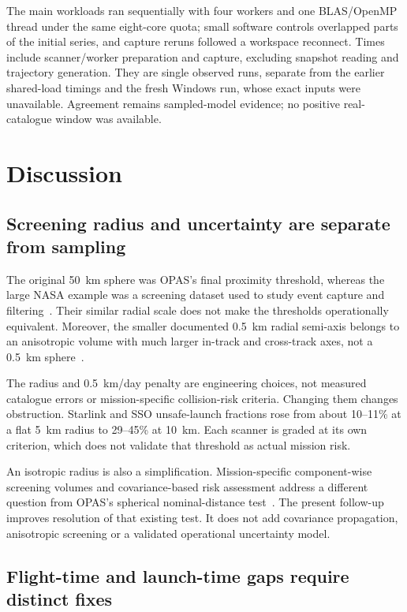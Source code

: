 \documentclass[11pt,a4paper]{article}
\begin{document}
The main workloads ran sequentially with four workers and one BLAS/OpenMP
thread under the same eight-core quota; small software controls overlapped
parts of the initial series, and capture reruns followed a workspace
reconnect. Times include scanner/worker preparation and capture, excluding
snapshot reading and trajectory generation. They are
single observed runs, separate from the earlier shared-load timings and the
fresh Windows run, whose exact inputs were unavailable. Agreement remains
sampled-model evidence; no positive real-catalogue window was available.

\section{Discussion}
\label{sec:discussion}

\subsection{Screening radius and uncertainty are separate from sampling}

The original 50~km sphere was OPAS's final proximity threshold, whereas
the large NASA example was a screening dataset used to study event
capture and filtering~\cite{nasa_screening}. Their similar radial scale
does not make the thresholds operationally equivalent. Moreover, the
smaller documented 0.5~km radial semi-axis belongs to an anisotropic
volume with much larger in-track and cross-track axes, not a 0.5~km
sphere~\cite{nasa_screening}.

The radius and 0.5~km/day penalty are engineering choices, not measured
catalogue errors or mission-specific collision-risk criteria. Changing
them changes obstruction. Starlink and SSO unsafe-launch fractions rose
from about 10--11\% at a flat 5~km radius to 29--45\% at 10~km. Each
scanner is graded at its own criterion, which does not validate that
threshold as actual mission risk.

An isotropic radius is also a simplification. Mission-specific
component-wise screening volumes and covariance-based risk assessment
address a different question from OPAS's spherical nominal-distance
test~\cite{nasa_handbook,nasa_screening}. The present follow-up improves
resolution of that existing test. It does not add covariance propagation,
anisotropic screening or a validated operational uncertainty model.

\subsection{Flight-time and launch-time gaps require distinct fixes}
\end{document}
